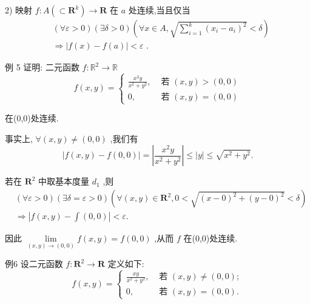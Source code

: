 2) 映射 $f : A\left( { \subset  {\mathbf{R}}^{k}}\right)  \rightarrow  \mathbf{R}$ 在 $a$ 处连续,当且仅当
\begin{align*}
	&\left( {\forall \varepsilon  > 0}\right) \left( {\exists \delta  > 0}\right) \left( {\forall x \in  A,\sqrt{\mathop{\sum }\limits_{{i = 1}}^{k}{\left( {x}_{i} - {a}_{i}\right) }^{2}} < \delta }\right)\\
	&\Rightarrow  \left| {f\left( x\right)  - f\left( a\right) }\right|  < \varepsilon \text{ . }
\end{align*}

例 5 证明: 二元函数 $f : {\mathbb{R}}^{2} \rightarrow  \mathbb{R}$
$$f\left( {x,y}\right)  = \left\{  \begin{array}{ll} \frac{{x}^{2}y}{{x}^{2} + {y}^{2}}, & \text{ 若 }\left( {x,y}\right)  > \left( {0,0}\right) \\  0, & \text{ 若 }\left( {x,y}\right)  = \left( {0,0}\right)  \end{array}\right.$$

在(0,0)处连续.

事实上, $\forall \left( {x,y}\right)  \neq  \left( {0,0}\right)$ ,我们有
$$\left| {f\left( {x,y}\right)  - f\left( {0,0}\right) }\right|  = \left| \frac{{x}^{2}y}{{x}^{2} + {y}^{2}}\right|  \leq  \left| y\right|  \leq  \sqrt{{x}^{2} + {y}^{2}}.$$

若在 ${\mathbf{R}}^{2}$ 中取基本度量 ${d}_{1}$ ,则
\begin{align*}
	&\left( {\forall \varepsilon  > 0}\right) \left( {\exists \delta  = \varepsilon  > 0}\right) \left( {\forall \left( {x,y}\right)  \in  {\mathbf{R}}^{2},0 < \sqrt{{\left( x - 0\right) }^{2} + {\left( y - 0\right) }^{2}} < \delta }\right)\\
	&\Rightarrow  \left| {f\left( {x,y}\right) -\int \left( {0,0}\right) }\right|  < \varepsilon .
\end{align*}

因此 $\mathop{\lim }\limits_{{\left( {x,y}\right)  \rightarrow  \left( {0,0}\right) }}f\left( {x,y}\right)  = f\left( {0,0}\right)$ ,从而 $f$ 在(0,0)处连续.

例6 设二元函数 $f : {\mathbf{R}}^{2} \rightarrow  \mathbf{R}$ 定义如下:
$$f\left( {x,y}\right)  = \left\{  \begin{array}{ll} \frac{xy}{{x}^{2} + {y}^{2}}, & \text{ 若 }\left( {x,y}\right)  \neq  \left( {0,0}\right) ; \\  0, & \text{ 若 }\left( {x,y}\right)  = \left( {0,0}\right) . \end{array}\right.$$

